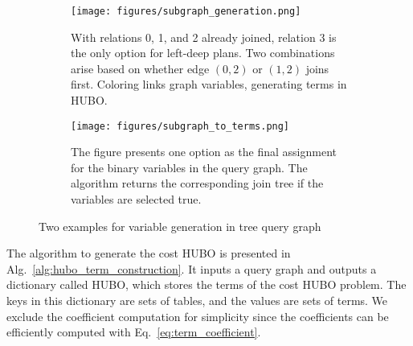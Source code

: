 \begin{figure}
\centering
\begin{subfigure}[t]{.49\linewidth}
  \centering
  \texttt{[image: figures/subgraph\_generation.png]}
  \caption{With relations 0, 1, and 2 already joined, relation 3 is the only option for left-deep plans. Two combinations arise based on whether edge $(0,2)$ or $(1,2)$ joins first. Coloring links graph variables, generating terms in HUBO.}
  \label{fig:subgraph_generation}
\end{subfigure}\hfill
\begin{subfigure}[t]{.49\linewidth}
  \centering
    \texttt{[image: figures/subgraph\_to\_terms.png]}
    \caption{The figure presents one option as the final assignment for the binary variables in the query graph. The algorithm returns the corresponding join tree if the variables are selected true.}
    \label{fig:subgraph_to_terms}
\end{subfigure}
\caption{Two examples for variable generation in tree query graph}
\label{fig:test}
\end{figure}

The algorithm to generate the cost HUBO is presented in Alg.~\ref{alg:hubo_term_construction}. It inputs a query graph and outputs a dictionary called HUBO, which stores the terms of the cost HUBO problem. The keys in this dictionary are sets of tables, and the values are sets of terms. We exclude the coefficient computation for simplicity since the coefficients can be efficiently computed with Eq.~\eqref{eq:term_coefficient}.

